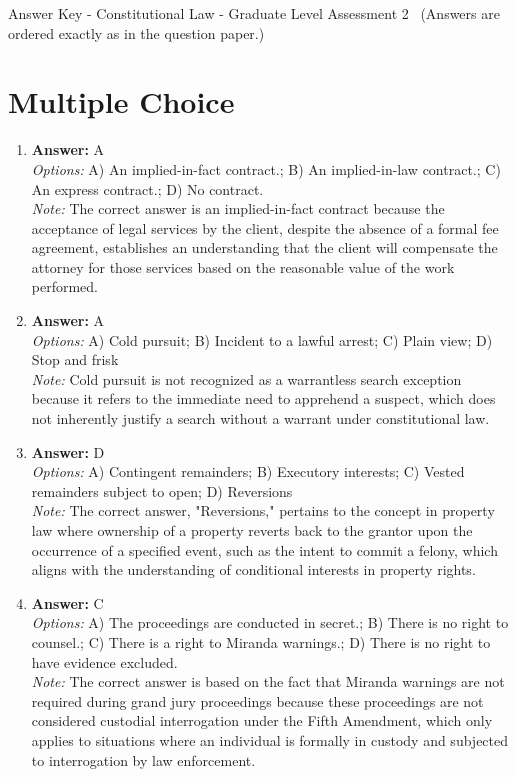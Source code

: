 \documentclass[12pt]{article}
\begin{document}
\begin{center}
Answer Key - Constitutional Law - Graduate Level Assessment 2 \
\small (Answers are ordered exactly as in the question paper.)
\end{center}

\section*{Multiple Choice}
\begin{enumerate}[label=\arabic*.]
\item \textbf{Answer:} A
\\ \textit{Options:} A) An implied-in-fact contract.; B) An implied-in-law contract.; C) An express contract.; D) No contract.
\\ \textit{Note:} The correct answer is an implied-in-fact contract because the acceptance of legal services by the client, despite the absence of a formal fee agreement, establishes an understanding that the client will compensate the attorney for those services based on the reasonable value of the work performed.
\item \textbf{Answer:} A
\\ \textit{Options:} A) Cold pursuit; B) Incident to a lawful arrest; C) Plain view; D) Stop and frisk
\\ \textit{Note:} Cold pursuit is not recognized as a warrantless search exception because it refers to the immediate need to apprehend a suspect, which does not inherently justify a search without a warrant under constitutional law.
\item \textbf{Answer:} D
\\ \textit{Options:} A) Contingent remainders; B) Executory interests; C) Vested remainders subject to open; D) Reversions
\\ \textit{Note:} The correct answer, "Reversions," pertains to the concept in property law where ownership of a property reverts back to the grantor upon the occurrence of a specified event, such as the intent to commit a felony, which aligns with the understanding of conditional interests in property rights.
\item \textbf{Answer:} C
\\ \textit{Options:} A) The proceedings are conducted in secret.; B) There is no right to counsel.; C) There is a right to Miranda warnings.; D) There is no right to have evidence excluded.
\\ \textit{Note:} The correct answer is based on the fact that Miranda warnings are not required during grand jury proceedings because these proceedings are not considered custodial interrogation under the Fifth Amendment, which only applies to situations where an individual is formally in custody and subjected to interrogation by law enforcement.

\end{enumerate}
\end{document}
